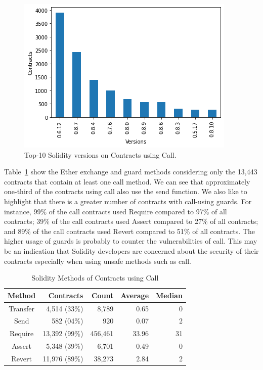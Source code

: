 \documentclass[10pt,conference]{IEEEtran}
\begin{document}
\begin{figure}[h]
  \centering
  \includegraphics[width=\linewidth]{img/call_clean_final.png}
  \caption{Top-10 Solidity versions on Contracts using Call. }
  \label{fig:call_version}
\end{figure}

Table~\ref{tab:call} show the Ether exchange and guard methods considering only the 13,443 contracts that contain at least one call method. We can see that approximately one-third of the contracts using call also use the send function. We also like to highlight that there is a greater number of contracts with call-using guards. For instance, 99\% of the call contracts used Require compared to 97\% of all contracts; 39\% of the call contracts used Assert compared to 27\% of all contracts; and 89\% of the call contracts used Revert compared to 51\% of all contracts. The higher usage of guards is probably to counter the vulnerabilities of call. This may be an indication that Solidity developers are concerned about the security of their contracts especially when using unsafe methods such as call.

\begin{table}
\center
  \caption{Solidity Methods of Contracts using Call}
  \label{tab:call}
  \begin{tabular}{crrrr}
    \hline
    Method & Contracts & Count & Average & Median\\
    \hline
    Transfer & 4,514 (33\%) & 8,789 & 0.65 & 0\\
    Send &582 (04\%) & 920 & 0.07 & 2\\
    Require &13,392 (99\%) & 456,461 & 33.96 & 31 \\
    Assert & 5,348 (39\%) & 6,701 & 0.49 & 0\\
    Revert & 11,976 (89\%) & 38,273 & 2.84 & 2\\
\end{tabular}
\end{table}
\end{document}
